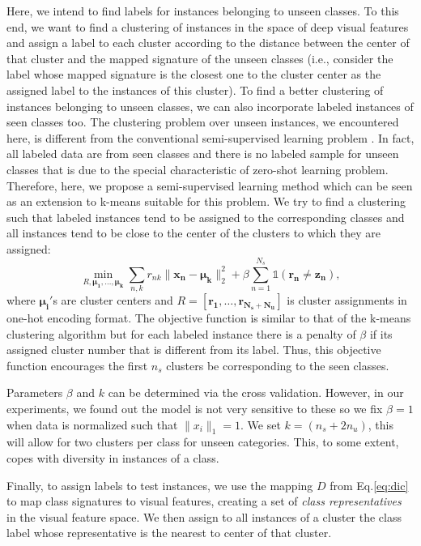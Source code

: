 \documentclass[letterpaper]{article}
\DeclareMathOperator*{\minimize}{min}
\begin{document}
Here, we intend to find labels for instances belonging to unseen classes. To this end, we want to find a clustering of instances
 in the space of deep visual features and assign a label to each cluster according to the distance between the center of that cluster
 and the mapped signature of the unseen classes
(i.e., consider the label whose mapped signature is the closest one to the cluster center as the assigned label to the instances of this cluster).
To find a better clustering of instances belonging to unseen classes,
 we can also incorporate labeled instances of seen classes too.
  The clustering problem over unseen instances, we encountered here, is different from the conventional semi-supervised learning problem \cite{chapel06}.
In fact, all labeled data are from seen classes and there is no labeled sample for unseen classes that is due to the special characteristic of zero-shot learning problem. Therefore, here, we propose a semi-supervised learning method which
can be seen as an extension to k-means suitable for this problem.
 We try to find a clustering such that labeled instances tend to be assigned to the corresponding classes and all instances tend to be close to the center of the clusters to which they are assigned:
\begin{equation} \label{eq:simple}
\minimize_{R, \mathbf{\mu_1, \ldots, \mu_k }}  \sum_{n,k} r_{nk} \lVert \mathbf{x_n - \mu_k} \rVert_2^2 +
 \beta \sum_{n=1}^{N_s} \mathds{1}(\mathbf{r_n \neq z_n}),
\end{equation}
where $\mathbf{\mu_i'}$s are cluster centers and $R = [\mathbf{r_1, \ldots, r_{N_s + N_u }} ]$ is cluster assignments in one-hot encoding format.
The objective function is similar to that of the k-means clustering algorithm but for each labeled instance there is a penalty of $\beta$ if its assigned cluster number that is different from its label. Thus, this objective function encourages
the first $n_s$ clusters be corresponding to the seen classes.

Parameters $\beta$ and $k$ can be determined via the cross validation. However, in our experiments, we found out
the model is not very sensitive to these so we fix $\beta=1$
when data is normalized such that $\lVert x_i \rVert_1 = 1$. We set $k =  (n_s + 2n_u)$, this
will allow for two clusters per class for unseen categories. This, to some extent, copes with diversity in instances of a class.


Finally, to assign labels to test instances, we use the mapping $D$ from Eq.\eqref{eq:dic} to
map class signatures to visual features, creating a set of \textit{class representatives}
 in the visual feature space. We then assign to all instances of a cluster the class label whose representative is
  the nearest to center of that cluster.
\end{document}
